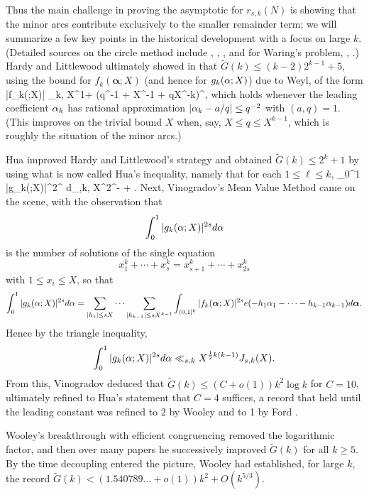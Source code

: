 \documentclass[brochure,english,12pt]{bourbaki}%
\newcommand{\albf}{\boldsymbol\alpha}
\begin{document}
Thus the main challenge in proving the asymptotic for $r_{s,k}(N)$ is showing that the minor arcs contribute exclusively to the smaller remainder term; we will summarize a few key points in the historical development with a focus on large $k$. (Detailed sources on the circle method include \cite{Vau97}, \cite[Ch. 20]{IK}, \cite{Dav05}, and for Waring's problem, \cite{VauWoo02}, \cite{Woo12b}.)
 Hardy and Littlewood ultimately showed in \cite{HarLit22} that $\tilde{G}(k) \leq (k-2)2^{k-1}+5$, using the bound for $f_k(\albf;X)$ (and hence for $g_k(\alpha;X)$) due to Weyl, of the form
\beq\label{Weyl_bound}
 |f_k(\albf;X)| \ll_{k,\ep} X^{1+\ep} (q^{-1} + X^{-1}  + qX^{-k})^{},
 \eeq
which holds whenever the leading coefficient $\alpha_k$ has rational approximation $|\alpha_k - a/q| \leq q^{-2}$ with $(a,q)=1$. 
(This improves on the trivial bound $X$ when, say, $X \leq q \leq X^{k-1}$, which is roughly the situation of the minor arcs.)

Hua \cite{Hua38} improved Hardy and Littlewood's strategy and obtained $\tilde{G}(k) \leq 2^k +1$ by using what is now called Hua's inequality, namely that for each $1 \leq \ell \leq k$,
\beq\label{Hua_ineq}
 \int_{0}^1 |g_k(\al;X)|^{2^\ell} d\al \ll_{\ell,k,\ep} X^{2^\ell - \ell + \ep}.
 \eeq
Next, Vinogradov's Mean Value Method came on the scene, with the observation that
\[ \int_0^1 |g_k(\alpha;X)|^{2s} d\alpha \]
is the number of solutions of the single equation
\[ x_1^k + \cdots + x_s^k = x_{s+1}^k  + \cdots + x_{2s}^k \]
with $1 \leq x_i \leq X$, so that 
\[ \int_0^1 |g_k(\al;X)|^{2s} d\al  = \sum_{|h_1| \leq sX} \cdots \sum_{|h_{k-1}| \leq sX^{k-1}} \int_{(0,1]^{k}} |f_k(\albf;X)|^{2s} e(-h_1 \al_1 - \cdots -h_{k-1} \al_{k-1} )d\albf.\]
Hence by the triangle inequality, 
\[ \int_0^1 |g_k(\alpha;X)|^{2s} d\alpha \ll_{s,k} X^{\frac{1}{2} k(k-1) } J_{s,k}(X).\]
From this, Vinogradov \cite{Vin35} deduced that $\tilde{G}(k) \leq (C+o(1))k^2 \log k$ for $C=10$, ultimately refined to Hua's statement \cite{Hua49} that $C=4$ suffices, a record that held until the leading constant was refined to $2$ by Wooley \cite{Woo92} and to 1 by Ford \cite{For95}.

Wooley's breakthrough with efficient congruencing removed the logarithmic factor, and then over many papers he successively improved $\tilde{G}(k)$ for all $k \geq 5$. By the time decoupling entered the picture, Wooley \cite[Thm. 12.2]{Woo17b} had established, for large $k$, the record $\tilde{G}(k) < (1.540789... +o(1)) k^2 +O(k^{5/3})$.
\end{document}
